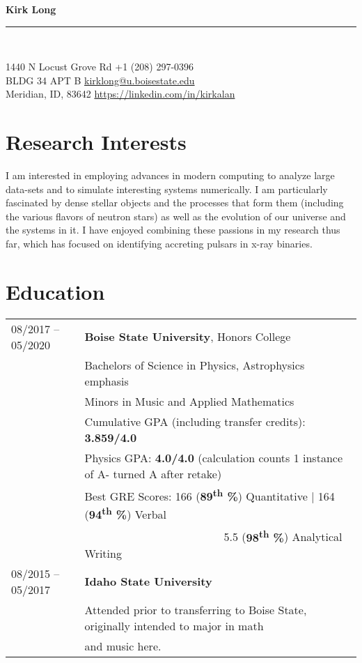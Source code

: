 \documentclass[11pt]{article}
\newcommand{\makeheading}[2]%
        {\begin{minipage}[t]{\textwidth}%
                 {\LARGE \bfseries #1} \\[-0.3\baselineskip]%
                 \rule{\columnwidth}{1.5pt}\\[0.1\baselineskip]
         \end{minipage}}
\begin{document}
\makeheading{Kirk Long}{}

1440 N Locust Grove Rd				\hfill	+1 (208) 297-0396\\
BLDG 34 APT B	\hfill	\href{mailto:kirklong@u.boisestate.edu}{kirklong@u.boisestate.edu}\\
Meridian, ID, 83642			\hfill	\url{https://linkedin.com/in/kirkalan}



\section{Research Interests}
 I am interested in employing advances in modern computing to analyze large data-sets and to simulate interesting systems numerically. I am particularly fascinated by dense stellar objects and the processes that form them (including the various flavors of neutron stars) as well as the evolution of our universe and the systems in it. I have enjoyed combining these passions in my research thus far, which has focused on identifying accreting pulsars in x-ray binaries.

\section{Education}
\begin{tabular}{ll}
08/2017 -- 05/2020	& 	\textbf{Boise State University}, Honors College \\
			&	Bachelors of Science in Physics, Astrophysics emphasis\\
			&	Minors in Music and Applied Mathematics\vspace{1mm} \\
			&	Cumulative GPA (including transfer credits): \textbf{3.859/4.0}\\
      & Physics GPA: \textbf{4.0/4.0} (calculation counts 1 instance of A- turned A after retake)\\
      & Best GRE Scores: 166 (\textbf{89\textsuperscript{th} \%}) Quantitative | 164 (\textbf{94\textsuperscript{th} \%}) Verbal \\
      & \-\ \-\ \-\ \-\ \-\ \-\ \-\ \-\ \-\ \-\ \-\ \-\ \-\ \-\ \-\ \-\ \-\ \-\ \-\ \-\ \-\ \-\ \-\ \-\ \-\ 5.5 (\textbf{98\textsuperscript{th} \%}) Analytical Writing \vspace{2mm} \\
08/2015 -- 05/2017 & \textbf{Idaho State University} \\
      & Attended prior to transferring to Boise State, originally intended to major in math\\
      & and music here.\\

\end{tabular}
\end{document}

